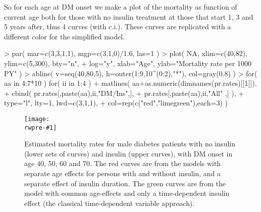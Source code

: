 \documentclass[a4paper,twoside,12pt]{report}
\newcommand{\rwpre}{sL}
\newcommand{\insfig}[3]{
\begin{figure}[h]
  \centering
  \texttt{[image: \\rwpre-\#1]}
  \caption{#3}
  \label{fig:#1}
\end{figure}}
\begin{document}
\begin{Schunk}
\end{Schunk}
So for each age at DM onset we make a plot of the mortality as function
of current age both for those with no insulin treatment at those that
start 1, 3 and 5 years after, thus 4 curves (with c.i.). These curves
are replicated with a different color for the simplified model.
\begin{Schunk}
\begin{Sinput}
> par( mar=c(3,3,1,1), mgp=c(3,1,0)/1.6, las=1 )
> plot( NA, xlim=c(40,82), ylim=c(5,300), bty="n",
+       log="y", xlab="Age", ylab="Mortality rate per 1000 PY" )
> abline( v=seq(40,80,5), h=outer(1:9,10^(0:2),"*"), col=gray(0.8) )
> for( aa in 4:7*10 ) for( ii in 1:4 )
+    matlines( aa+as.numeric(dimnames(pr.rates)[[1]]),
+             cbind( pr.rates[,paste(aa),ii,"DM/Ins",],
+                    pr.rates[,paste(aa),ii,"All"   ,] ),
+             type="l", lty=1, lwd=c(3,1,1),
+             col=rep(c("red","limegreen"),each=3) )
\end{Sinput}
\end{Schunk}
\insfig{mort-int}{0.9}{Estimated mortality rates for male diabetes
  patients with no insulin (lower sets of curves) and insulin (upper curves),
  with DM onset in age 40, 50, 60 and 70. The red curves are from
  the models with separate age effects for persons with and without
  insulin, and a separate effect of insulin duration. The green curves
  are from the model with common age-effects and only a time-dependent
  insulin effect (the classical time-dependent variable approach).}
\end{document}

